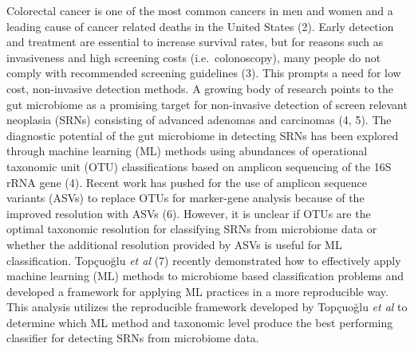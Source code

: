 \documentclass[
]{article}
\begin{document}
\newpage

Colorectal cancer is one of the most common cancers in men and women and
a leading cause of cancer related deaths in the United States (2). Early
detection and treatment are essential to increase survival rates, but
for reasons such as invasiveness and high screening costs
(i.e.~colonoscopy), many people do not comply with recommended screening
guidelines (3). This prompts a need for low cost, non-invasive detection
methods. A growing body of research points to the gut microbiome as a
promising target for non-invasive detection of screen relevant neoplasia
(SRNs) consisting of advanced adenomas and carcinomas (4, 5). The
diagnostic potential of the gut microbiome in detecting SRNs has been
explored through machine learning (ML) methods using abundances of
operational taxonomic unit (OTU) classifications based on amplicon
sequencing of the 16S rRNA gene (4). Recent work has pushed for the use
of amplicon sequence variants (ASVs) to replace OTUs for marker-gene
analysis because of the improved resolution with ASVs (6). However, it
is unclear if OTUs are the optimal taxonomic resolution for classifying
SRNs from microbiome data or whether the additional resolution provided
by ASVs is useful for ML classification. Topçuoğlu \emph{et al} (7)
recently demonstrated how to effectively apply machine learning (ML)
methods to microbiome based classification problems and developed a
framework for applying ML practices in a more reproducible way. This
analysis utilizes the reproducible framework developed by Topçuoğlu
\emph{et al} to determine which ML method and taxonomic level produce
the best performing classifier for detecting SRNs from microbiome data.
\end{document}
